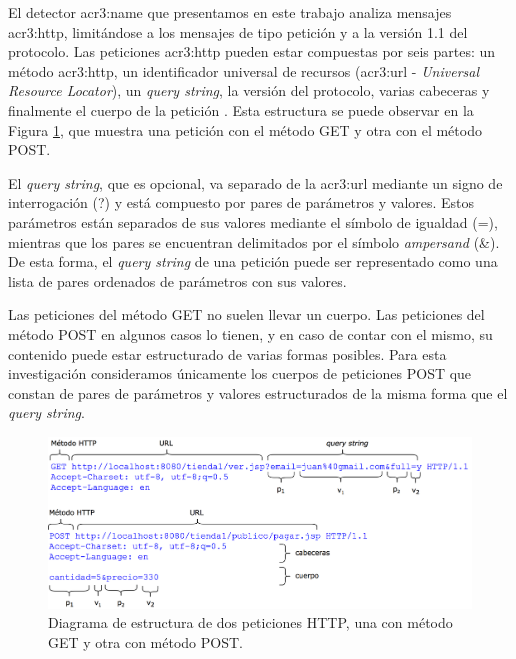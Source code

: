 El detector \gls{acr3:name} que presentamos en este trabajo analiza
mensajes \gls{acr3:http}, limitándose a los mensajes de tipo petición
y a la versión 1.1 del protocolo.
Las peticiones \gls{acr3:http} pueden estar compuestas por seis partes:
un método \gls{acr3:http}, un identificador universal de recursos
(\gls{acr3:url} - \textit{Universal Resource Locator}), un \textit{query string},
la versión del protocolo, varias cabeceras y finalmente el cuerpo de la
petición \cite{fielding1999http}. %
Esta estructura se puede observar en la Figura \ref{fig:fe:http_request_structure},
que muestra una petición con el método GET y otra con el método POST.

El \textit{query string}, que es opcional, va separado de la \gls{acr3:url}
mediante un signo de interrogación (?) y está compuesto por pares de
parámetros y valores. Estos parámetros están separados de sus valores
mediante el símbolo de igualdad (=), mientras que los pares se encuentran
delimitados por el símbolo \textit{ampersand} (\&). De esta forma, el
\textit{query string} de una petición puede ser representado como una
lista de pares ordenados de parámetros con sus valores.

Las peticiones del método GET no suelen llevar un cuerpo. Las peticiones
del método POST en algunos casos lo tienen, y en caso de contar con el
mismo, su contenido puede estar estructurado de varias formas posibles.
Para esta investigación consideramos únicamente los cuerpos de peticiones
POST que constan de pares de parámetros y valores estructurados de la
misma forma que el \textit{query string}.

\begin{figure}[ht]
    \centering
    \includegraphics[width=\linewidth]{images/http-request-structure.png}

    \caption{Diagrama de estructura de dos peticiones HTTP, una con
        método GET y otra con método POST.}
    \label{fig:fe:http_request_structure}
\end{figure}


